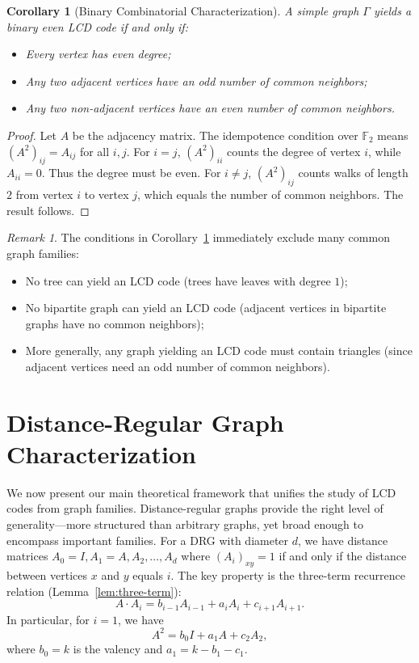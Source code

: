 \documentclass[a4paper,11pt]{article}
\newtheorem{corollary}[theorem]{Corollary}
\theoremstyle{remark}
\newtheorem{remark}[theorem]{Remark}
\newcommand{\FF}{\mathbb{F}}
\begin{document}
\begin{corollary}[Binary Combinatorial Characterization]\label{cor:binary-char}
A simple graph $\Gamma$ yields a binary even LCD code if and only if:
\begin{itemize}
\item Every vertex has even degree;
\item Any two adjacent vertices have an odd number of common neighbors;
\item Any two non-adjacent vertices have an even number of common neighbors.
\end{itemize}
\end{corollary}

\begin{proof}
Let $A$ be the adjacency matrix. The idempotence condition over $\FF_2$ means $(A^2)_{ij} = A_{ij}$ for all $i,j$. For $i = j$, $(A^2)_{ii}$ counts the degree of vertex $i$, while $A_{ii} = 0$. Thus the degree must be even. For $i \neq j$, $(A^2)_{ij}$ counts walks of length $2$ from vertex $i$ to vertex $j$, which equals the number of common neighbors. The result follows.
\end{proof}

\begin{remark}\label{rem:excluded-families}
The conditions in Corollary~\ref{cor:binary-char} immediately exclude many common graph families:
\begin{itemize}
\item No tree can yield an LCD code (trees have leaves with degree $1$);
\item No bipartite graph can yield an LCD code (adjacent vertices in bipartite graphs have no common neighbors);
\item More generally, any graph yielding an LCD code must contain triangles (since adjacent vertices need an odd number of common neighbors).
\end{itemize}
\end{remark}

\section{Distance-Regular Graph Characterization}\label{sec:drg}

We now present our main theoretical framework that unifies the study of LCD codes from graph families. Distance-regular graphs provide the right level of generality—more structured than arbitrary graphs, yet broad enough to encompass important families. For a DRG with diameter $d$, we have distance matrices $A_0 = I, A_1 = A, A_2, \ldots, A_d$ where $(A_i)_{xy} = 1$ if and only if the distance between vertices $x$ and $y$ equals $i$. The key property is the three-term recurrence relation (Lemma~\ref{lem:three-term}):
\[
A \cdot A_i = b_{i-1}A_{i-1} + a_i A_i + c_{i+1}A_{i+1}.
\]
In particular, for $i = 1$, we have
\[
A^2 = b_0 I + a_1 A + c_2 A_2,
\]
where $b_0 = k$ is the valency and $a_1 = k - b_1 - c_1$.
\end{document}
